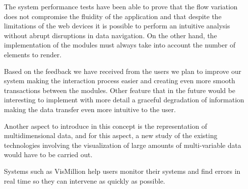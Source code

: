 \documentclass[letterpaper, 10 pt, conference]{ieeeconf}  %
\begin{document}
The system performance tests have been able to prove that the flow variation does not compromise the fluidity of the application and that despite the limitations of the web devices it is possible to perform an intuitive analysis without abrupt disruptions in data navigation. On the other hand, the implementation of the modules must always take into account the number of elements to render.

Based on the feedback we have received from the users we plan to improve our system making the interaction process easier and creating even more smooth transactions between the modules. Other feature that in the future would be interesting to implement with more detail a graceful degradation of information making the data transfer even more intuitive to the user.

Another aspect to introduce in this concept is the representation of multidimensional data, and for this aspect, a new study of the existing technologies involving the visualization of large amounts of multi-variable data would have to be carried out.

Systems such as VisMillion help users monitor their systems and find errors in real time so they can intervene as quickly as possible.

\addtolength{\textheight}{-12cm}   %















\end{document}
